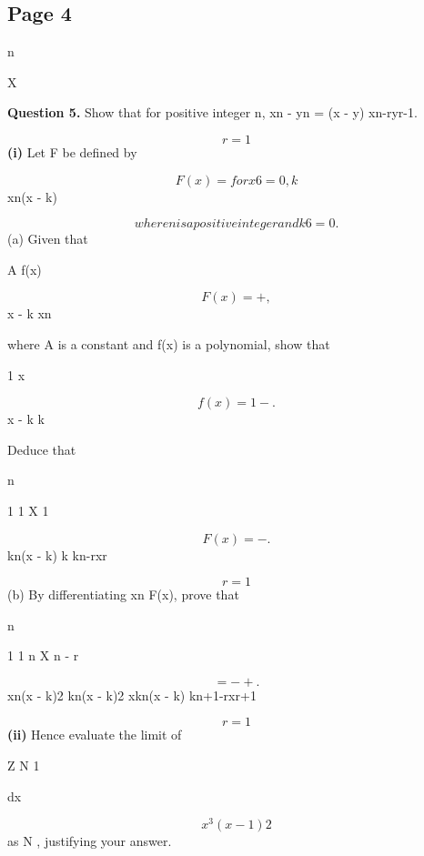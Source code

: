 \documentclass[12pt]{article}
\begin{document}
\subsection*{Page 4}
\begin{flushleft}
n\par
X\par
\bigskip\textbf{Question 5.} Show that for positive integer n, xn - yn = (x - y) xn-ryr-1.\par
\[r=1\]
\textbf{(i)} Let F be defined by\par
\[F(x) = for x 6= 0, k\]
xn(x - k)\par
\[where n is a positive integer and k 6= 0.\]
(a) Given that\par
A f(x)\par
\[F(x) = + ,\]
x - k xn\par
where A is a constant and f(x) is a polynomial, show that\par
1 \gamma \gamma x \deltan\delta\par
\[f(x) = 1 - .\]
x - k k\par
Deduce that\par
n\par
1 1 X 1\par
\[F(x) = - .\]
kn(x - k) k kn-rxr\par
\[r=1\]
(b) By differentiating xn F(x), prove that\par
n\par
1 1 n X n - r\par
\[= - + .\]
xn(x - k)2 kn(x - k)2 xkn(x - k) kn+1-rxr+1\par
\[r=1\]
\textbf{(ii)} Hence evaluate the limit of\par
Z N 1\par
dx\par
\[x^3(x - 1)2\]
as N \to \infty, justifying your answer.\par
\end{flushleft}
\end{document}
